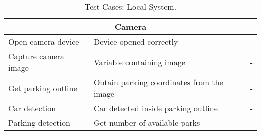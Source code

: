 \begin{table}[H]
{\begin{tabular}{|m{4cm}|m{5cm}||m{5cm}|}
			\multicolumn{3}{c}{\textbf{Camera}}\\\hline
			Open camera device & Device opened correctly & -
			\\\hline
			Capture camera image & Variable containing image & -
			\\\hline
			Get parking outline & Obtain parking coordinates from the image & -
			\\\hline
			Car detection & Car detected inside parking outline & -
			\\\hline
			Parking detection & Get number of available parks & -
			\\\hline
		\end{tabular}
	}
	\caption{Test Cases: Local System.}
	\label{table:test_localsystem}
\end{table}
